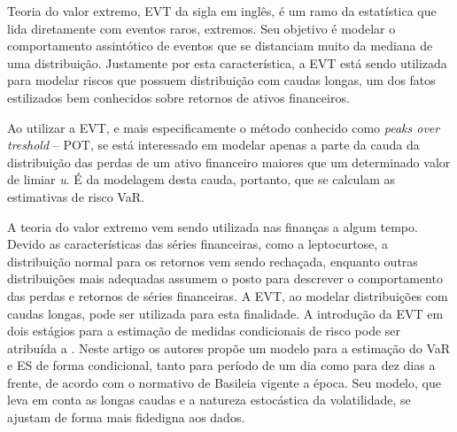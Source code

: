 \documentclass[1p]{elsarticle}
\theoremstyle{definition}
\begin{document}

Teoria do valor extremo, EVT da sigla em inglês, é um ramo da estatística que lida diretamente com eventos raros, extremos. Seu objetivo é modelar o comportamento assintótico de eventos que se distanciam muito da mediana de uma distribuição. Justamente por esta característica, a EVT está sendo utilizada para modelar riscos que possuem distribuição com caudas longas, um dos fatos estilizados bem conhecidos sobre retornos de ativos financeiros.

Ao utilizar a EVT, e mais especificamente o método conhecido como \emph{peaks over treshold} – POT, se está interessado em modelar apenas a parte da cauda da distribuição das perdas de um ativo financeiro maiores que um determinado valor de limiar \emph{u}. É da modelagem desta cauda, portanto, que se calculam as estimativas de risco VaR.

A teoria do valor extremo vem sendo utilizada nas finanças a algum tempo. Devido as características das séries financeiras, como a leptocurtose, a distribuição normal para os retornos vem sendo rechaçada, enquanto outras distribuições mais adequadas assumem o posto para descrever o comportamento das perdas e retornos de séries financeiras. A EVT, ao modelar distribuições com caudas longas, pode ser utilizada para esta finalidade. A introdução da EVT em dois estágios para a estimação de medidas condicionais de risco pode ser atribuída a \cite{McNeil2000}. Neste artigo os autores propõe um modelo para a estimação do VaR e ES de forma condicional, tanto para período de um dia como para dez dias a frente, de acordo com o normativo de Basileia vigente a época. Seu modelo, que leva em conta as longas caudas e a natureza estocástica da volatilidade, se ajustam de forma mais fidedigna aos dados.
\end{document}
